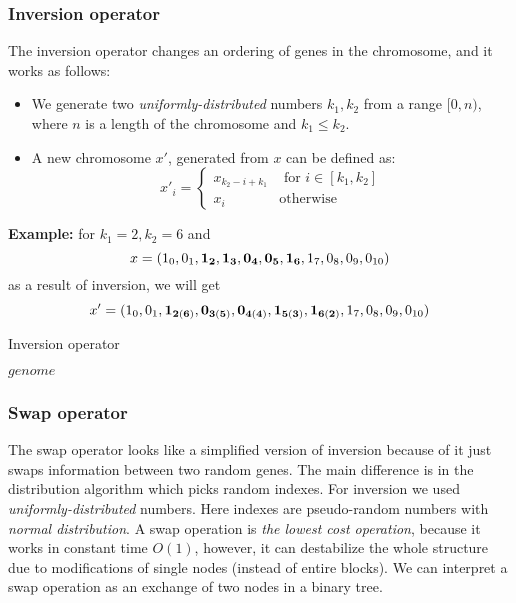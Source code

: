 \documentclass[12pt]{article}
\newlength\singleindent
\newcommand\bindent{%
  \begingroup
  \setlength{\itemindent}{\singleindent}
  \addtolength{\algorithmicindent}{\singleindent}
}
\newcommand\eindent{\endgroup}
\begin{document}
\subsubsection{Inversion operator}

The inversion operator changes an ordering of genes in the chromosome, and it works as follows:
\begin{itemize}
\item We generate two \textit{uniformly-distributed} numbers $k_1, k_2$ from a range $[0, n)$, where $n$ is a length of the chromosome and $k_1 \leq k_2$.
\item A new chromosome $x'$, generated from $x$ can be defined as:
\[
    x'_i = \left\{
   \begin{array}{lr}
      x_{k_2 - i + k_1} & \textrm{ for } i\in\left[k_1, k_2\right]\\
      x_i &\textrm{otherwise}
   \end{array}
   \right.
\]
\end{itemize}

{\bf Example:} for $k_1 = 2, k_2 = 6$ and
\[
x = (1_0, 0_1, {\bf 1_2, 1_3, 0_4, 0_5, 1_6}, 1_7, 0_8, 0_9, 0_{10})
\]
as a result of inversion, we will get
\[
x' = (1_0, 0_1, {\bf 1_{2(6)}, 0_{3(5)}, 0_{4(4)}, 1_{5(3)}, 1_{6(2)}}, 1_7, 0_8, 0_9, 0_{10})
\]

\begin{algorithm}
\scriptsize
\caption{Inversion operator}
\begin{algorithmic}[]
    \bindent
        \ENDIF
        \ENDFOR
        \RETURN $genome$
    \eindent
\end{algorithmic}
\end{algorithm}

\subsubsection{Swap operator}

The swap operator looks like a simplified version of inversion because of it just swaps information between two random genes. The main difference is in the distribution algorithm which picks random indexes. For inversion we used \textit{uniformly-distributed} numbers. Here indexes are pseudo-random numbers with \textit{normal distribution}.
A swap operation is \textit{the lowest cost operation}, because it works in constant time $O(1)$, however, it can destabilize the whole structure due to modifications of single nodes (instead of entire blocks). We can interpret a swap operation as an exchange of two nodes in a binary tree.
\end{document}
